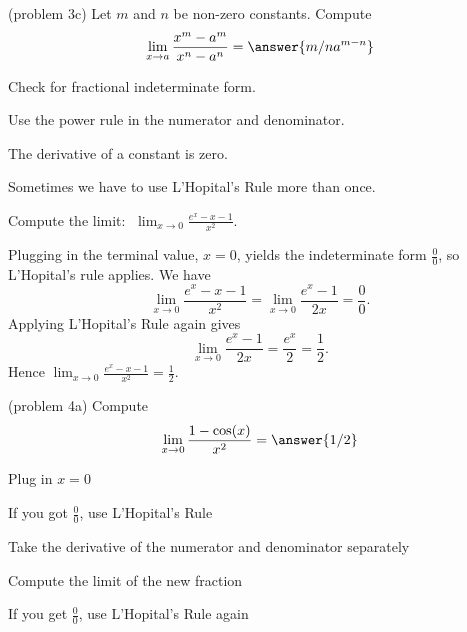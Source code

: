 \documentclass{ximera}
\begin{document}
\begin{problem}(problem 3c)
  Let $m$ and $n$ be non-zero constants. Compute
  \[
  \lim_{x \to a} \frac{x^m - a^m}{x^n - a^n} = \answer{m/n a^{m-n}}
  \]
  
    \begin{hint}
      Check for fractional indeterminate form.
    \end{hint}
    \begin{hint}
      Use the power rule in the numerator and denominator.
    \end{hint}
	  \begin{hint}
      The derivative of a constant is zero.
    \end{hint}
  
\end{problem}



Sometimes we have to use L'Hopital's Rule more than once.

\begin{example}[example 4]
Compute the limit:  $\displaystyle{\;\lim_{x \to 0} \frac{e^x - x - 1}{x^2}}.$

Plugging in the terminal value, $x=0$, yields 
the indeterminate form $\frac00$, so L'Hopital's rule applies.
We have 
\[\lim_{x \to 0} \frac{e^x - x - 1}{x^2} = \lim_{x \to 0} \frac{e^x -1}{2x} = \frac{0}{0}.\]
Applying L'Hopital's Rule again gives
\[\lim_{x \to 0} \frac{e^x -1}{2x} = \frac{e^x}{2} = \frac{1}{2}.\]
Hence $\displaystyle{\lim_{x \to 0} \frac{e^x - x - 1}{x^2} = \frac 12}.$
\end{example}


\begin{problem}(problem 4a)
  Compute
  \[
  \lim_{x \to 0} \frac{1 - \cos(x)}{x^2} = \answer{1/2}
  \]
  
    \begin{hint}
      Plug in $x=0$
    \end{hint}
    \begin{hint}
      If you got $\frac00$, use L'Hopital's Rule
    \end{hint}
    \begin{hint}
      Take the derivative of the numerator and denominator separately
    \end{hint}
	  \begin{hint}
      Compute the limit of the new fraction
    \end{hint}
		\begin{hint}
		 If you get $\frac00$, use L'Hopital's Rule again
    \end{hint}

	
\end{problem}
\end{document}
